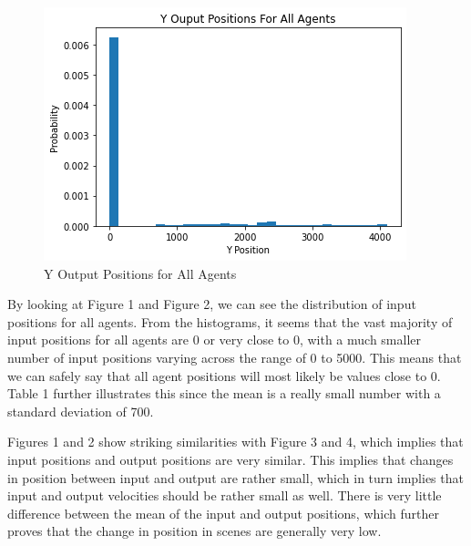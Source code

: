 \documentclass{article}
\begin{document}
\begin{figure}[H]
    \centering
    \includegraphics[scale=.5]{p_out_y.png}
    \caption{Y Output Positions for All Agents}
    \label{fig:y_output}
\end{figure}

By looking at Figure 1 and Figure 2, we can see the distribution of input positions for all agents. From the histograms, it seems that the vast majority of input positions for all agents are 0 or very close to 0, with a much smaller number of input positions varying across the range of 0 to 5000. This means that we can safely say that all agent positions will most likely be values close to 0. Table 1 further illustrates this since the mean is a really small number with a standard deviation of 700. 

Figures 1 and 2 show striking similarities with Figure 3 and 4, which implies that input positions and output positions are very similar. This implies that changes in position between input and output are rather small, which in turn implies that input and output velocities should be rather small as well. There is very little difference between the mean of the input and output positions, which further proves that the change in position in scenes are generally very low. 
\end{document}
